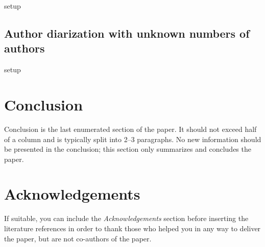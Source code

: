 \documentclass[10pt, a4paper]{article}
\begin{document}
setup

\subsection{Author diarization with unknown numbers of authors}

setup

\section{Conclusion}

Conclusion is the last enumerated section of the paper. It should not exceed half of a column and is typically split into 2--3 paragraphs. No new information should be presented in the conclusion; this section only summarizes and concludes the paper.

\section*{Acknowledgements}

If suitable, you can include the \textit{Acknowledgements} section before inserting the literature references  in order to thank those who helped you in any way to deliver the paper, but are not co-authors of the paper.


 
\end{document}
